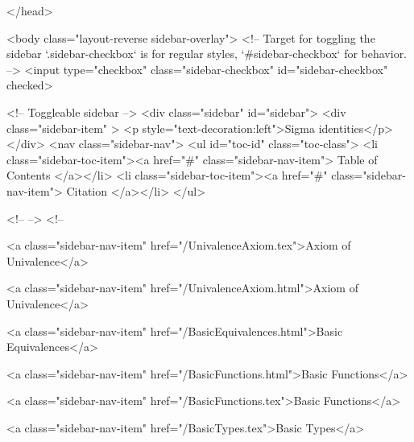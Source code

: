   
</head>




  <body class="layout-reverse sidebar-overlay">
    <!-- Target for toggling the sidebar `.sidebar-checkbox` is for regular
     styles, `#sidebar-checkbox` for behavior. -->
<input type="checkbox" class="sidebar-checkbox" id="sidebar-checkbox" checked>

<!-- Toggleable sidebar -->
<div class="sidebar" id="sidebar">
  <div class="sidebar-item" >
    <p style="text-decoration:left">Sigma identities</p>
  </div>
  <nav class="sidebar-nav">
    <ul id="toc-id" class="toc-class">
  <li class="sidebar-toc-item"><a href="#" class="sidebar-nav-item"> Table of Contents </a></li>
  <li class="sidebar-toc-item"><a href="#" class="sidebar-nav-item"> Citation </a></li>
</ul>


    <!--  -->
    <!-- 
      
    
      
    
      
    
      
    
      
        
      
    
      
        
          <a class="sidebar-nav-item" href="/UnivalenceAxiom.tex">Axiom of Univalence</a>
        
      
    
      
        
          <a class="sidebar-nav-item" href="/UnivalenceAxiom.html">Axiom of Univalence</a>
        
      
    
      
        
          <a class="sidebar-nav-item" href="/BasicEquivalences.html">Basic Equivalences</a>
        
      
    
      
        
          <a class="sidebar-nav-item" href="/BasicFunctions.html">Basic Functions</a>
        
      
    
      
        
          <a class="sidebar-nav-item" href="/BasicFunctions.tex">Basic Functions</a>
        
      
    
      
        
          <a class="sidebar-nav-item" href="/BasicTypes.tex">Basic Types</a>
        
